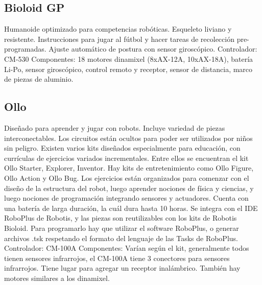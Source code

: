 \subsection{Bioloid GP}
Humanoide optimizado para competencias robóticas. Esqueleto liviano y resistente. Instrucciones para jugar al fútbol y hacer tareas de recolección pre-programadas. Ajuste automático de postura con sensor giroscópico.
Controlador:
CM-530
Componentes:
18 motores dinamixel (8xAX-12A, 10xAX-18A), batería Li-Po, sensor giroscópico, control remoto y receptor, sensor de distancia, marco de piezas de aluminio.

\subsection{Ollo}
Diseñado para aprender y jugar con robots. Incluye variedad de piezas interconectables. 
Los circuitos están ocultos para poder ser utilizados por niños sin peligro. 
Existen varios kits diseñados especialmente para educación, con currículas de ejercicios variados incrementales. Entre ellos se encuentran el kit Ollo Starter, Explorer, Inventor. Hay kits de entretenimiento como Ollo Figure, Ollo Action y Ollo Bug.
Los ejercicios están organizados para comenzar con el diseño de la estructura del robot, luego aprender nociones de física y ciencias, y luego nociones de programación integrando sensores y actuadores.
Cuenta con una batería de larga duración, la cuál dura hasta 10 horas.
Se integra con el IDE RoboPlus de Robotis, y las piezas son reutilizables con los kits de Robotis Bioloid.
Para programarlo hay que utilizar el software RoboPlus, o generar archivos .tsk respetando el formato del lenguaje de las Tasks de RoboPlus.
Controlador:
CM-100A
Componentes:
Varían según el kit, generalmente todos tienen sensores infrarrojos, el CM-100A tiene 3 conectores para sensores infrarrojos. Tiene lugar para agregar un receptor inalámbrico. También hay motores similares a los dinamixel.



